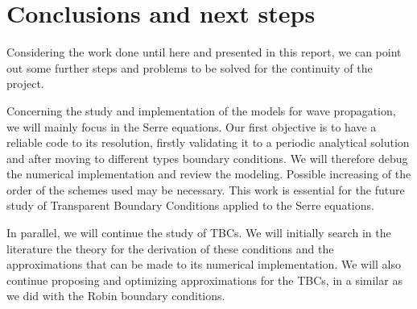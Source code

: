 \section{Conclusions and next steps}

\indent Considering the work done until here and presented in this report, we can point out some further steps and problems to be solved for the continuity of the project.

\indent Concerning the study and implementation of the models for wave propagation, we will mainly focus in the Serre equations. Our first objective is to have a reliable code to its resolution, firstly validating it to a periodic analytical solution and after moving to different types boundary conditions. We will therefore debug the numerical implementation and review the modeling. Possible increasing of the order of the schemes used may be necessary. This work is essential for the future study of Transparent Boundary Conditions applied to the Serre equations.

\indent In parallel, we will continue the study of TBCs. We will initially search in the literature the theory for the derivation of these conditions and the approximations that can be made to its numerical implementation. We will also continue proposing and optimizing approximations for the TBCs, in a similar as we did with the Robin boundary conditions.